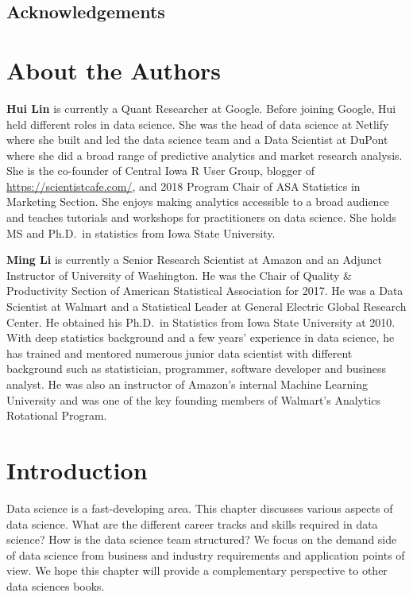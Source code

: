 \documentclass[12pt,]{krantz}
\begin{document}
\hypertarget{acknowledgements}{%
\section*{Acknowledgements}\label{acknowledgements}}


\hypertarget{about-the-authors}{%
\chapter*{About the Authors}\label{about-the-authors}}


\textbf{Hui Lin} is currently a Quant Researcher at Google. Before joining Google, Hui held
different roles in data science. She was the head of data science at Netlify where she built
and led the data science team and a Data Scientist at DuPont where she did a broad range
of predictive analytics and market research analysis. She is the co-founder of Central
Iowa R User Group, blogger of \url{https://scientistcafe.com/}, and 2018 Program Chair of
ASA Statistics in Marketing Section. She enjoys making analytics accessible to a broad
audience and teaches tutorials and workshops for practitioners on data science. She holds
MS and Ph.D.~in statistics from Iowa State University.

\textbf{Ming Li} is currently a Senior Research Scientist at Amazon and an Adjunct Instructor of University of Washington. He was the Chair of Quality \& Productivity Section of American Statistical Association for 2017. He was a Data Scientist at Walmart and a Statistical Leader at General Electric Global Research Center. He obtained his Ph.D.~in Statistics from Iowa State University at 2010. With deep statistics background and a few years' experience in data science, he has trained and mentored numerous junior data scientist with different background such as statistician, programmer, software developer and business analyst. He was also an instructor of Amazon's internal Machine Learning University and was one of the key founding members of Walmart's Analytics Rotational Program.

\mainmatter

\hypertarget{introduction}{%
\chapter{Introduction}\label{introduction}}

Data science is a fast-developing area. This chapter discusses various aspects of data science. What are the different career tracks and skills required in data science? How is the data science team structured? We focus on the demand side of data science from business and industry requirements and application points of view. We hope this chapter will provide a complementary perspective to other data sciences books.
\end{document}
